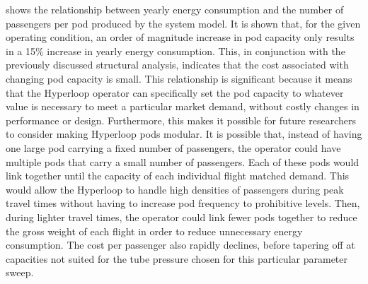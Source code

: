  shows the relationship between yearly
energy consumption and the number of passengers per pod produced by the system model.
It is shown that, for the given operating condition, an order of magnitude
increase in pod capacity only results in a 15\% increase in yearly energy consumption.
This, in conjunction with the previously discussed structural analysis,
indicates that the cost associated with changing pod capacity is small.
This relationship is significant because it means that the Hyperloop operator
can specifically set the pod capacity to whatever value is necessary to meet a
particular market demand, without costly changes in performance or design.
Furthermore, this makes it possible for future researchers to consider making
Hyperloop pods modular. It is possible that, instead of having one large pod
carrying a fixed number of passengers, the operator could have multiple pods
that carry a small number of passengers. Each of these pods would link together until the capacity
of each individual flight matched demand.
This would allow the Hyperloop to handle high densities of passengers during
peak travel times without having to increase pod frequency to prohibitive levels.
Then, during lighter travel times, the operator could link fewer pods together
to reduce the gross weight of each flight in order to reduce unnecessary energy consumption.
The cost per passenger also rapidly declines, before tapering off at capacities
not suited for the tube pressure chosen for this particular parameter sweep.
